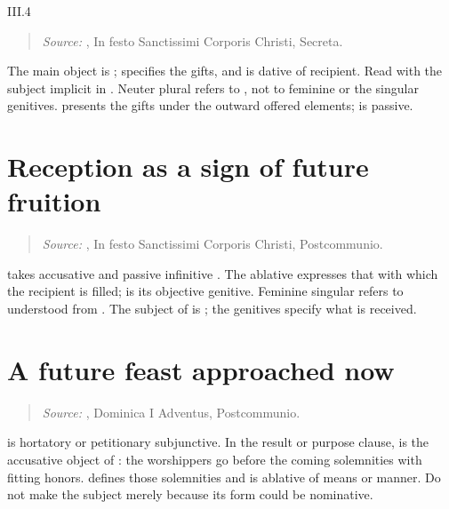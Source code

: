 \begin{courseunit}{III.4}
\begin{quote}
\emph{Source:} \Missal, In festo Sanctissimi Corporis Christi, Secreta.
\end{quote}

The main object is ;  specifies the gifts,
and  is dative of recipient. Read  with
the subject implicit in . Neuter plural  refers to
, not to feminine  or the singular genitives.
 presents the gifts under the outward offered
elements;  is passive.

\section{Reception as a sign of future fruition}

\begin{quote}

\emph{Source:} \Missal, In festo Sanctissimi Corporis Christi, Postcommunio.
\end{quote}

 takes accusative  and passive infinitive
. The ablative  expresses that with which the
recipient is filled;  is its objective genitive.
Feminine singular  refers to  understood from
. The subject of  is ; the genitives  specify
what is received.

\section{A future feast approached now}

\begin{quote}

\emph{Source:} \Missal, Dominica I Adventus, Postcommunio.
\end{quote}

 is hortatory or petitionary subjunctive. In the result or
purpose clause,  is the accusative object of
: the worshippers go before the coming solemnities with
fitting honors.  defines those solemnities and
 is ablative of means or manner. Do not make
 the subject merely because its form could be nominative.


\end{courseunit}
